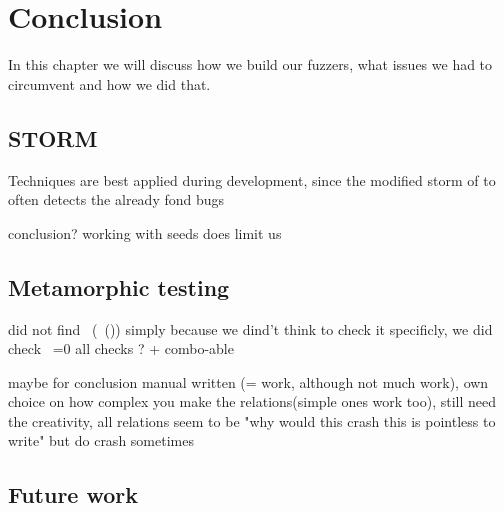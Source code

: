 \chapter{Conclusion}
\label{cha:x}
In this chapter we will discuss how we build our fuzzers, what issues we had to circumvent and how we did that. 




\section{STORM}
Techniques are best applied during development, since the modified storm of to often detects the already fond bugs

conclusion? 
working with seeds does limit us



\section{Metamorphic testing}
did not find ~(~()) simply because we dind't think to check it specificly, we did check ~=0
all checks ? + combo-able

maybe for conclusion
manual written (= work, although not much work), own choice on how complex you make the relations(simple ones work too), still need the creativity, all relations seem to be "why would this crash this is pointless to write" but do crash sometimes


\section{Future work}




